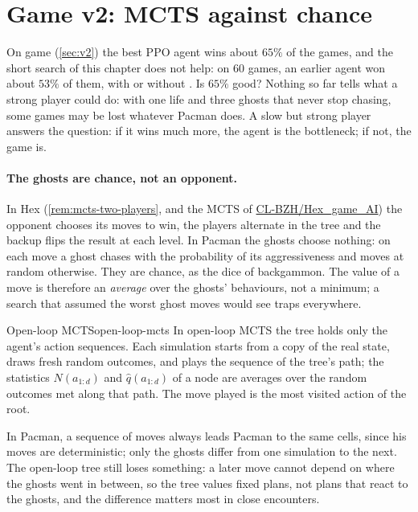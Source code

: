 \section{Game v2: MCTS against chance}
\label{sec:mcts-v2}

On game  (\cref{sec:v2}) the best PPO agent wins about $65\%$ of
the games, and the short search of this chapter does not help: on $60$
games, an earlier  agent won about $53\%$ of them, with or
without .
Is $65\%$ good? Nothing so far tells what a strong player could do: with
one life and three ghosts that never stop chasing, some games may be lost
whatever Pacman does. A slow but strong player answers the question: if it
wins much more, the agent is the bottleneck; if not, the game is.

\paragraph{The ghosts are chance, not an opponent.} In Hex
(\cref{rem:mcts-two-players}, and the MCTS of
\href{https://github.com/CL-BZH/Hex_game_AI}{CL-BZH/Hex\_game\_AI}) the
opponent chooses its moves to win, the
players alternate in the tree and the backup flips the result at each
level. In Pacman the ghosts choose nothing: on each move a ghost chases with
the probability of its aggressiveness and moves at random otherwise. They
are chance, as the dice of backgammon. The value of a move is therefore an
\emph{average} over the ghosts' behaviours, not a minimum; a search that
assumed the worst ghost moves would see traps everywhere.

\begin{definition}{Open-loop MCTS}{open-loop-mcts}
  In open-loop MCTS the tree holds only the agent's action sequences. Each
  simulation starts from a copy of the real state, draws fresh random
  outcomes, and plays the sequence of the tree's path; the statistics
  $N(a_{1:d})$ and $\hat q(a_{1:d})$ of a node are averages over the random
  outcomes met along that path. The move played is the most visited action
  of the root.
\end{definition}

In Pacman, a sequence of moves always leads Pacman to the same cells, since
his moves are deterministic; only the ghosts differ from one simulation to
the next. The open-loop tree still loses something: a later move cannot
depend on where the ghosts went in between, so the tree values fixed plans,
not plans that react to the ghosts, and the difference matters most in
close encounters.

